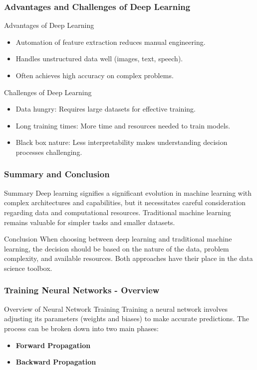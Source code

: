 \documentclass[aspectratio=169]{beamer}
\begin{document}
\begin{frame}[fragile]
    \frametitle{Advantages and Challenges of Deep Learning}
    \begin{block}{Advantages of Deep Learning}
        \begin{itemize}
            \item Automation of feature extraction reduces manual engineering.
            \item Handles unstructured data well (images, text, speech).
            \item Often achieves high accuracy on complex problems.
        \end{itemize}
    \end{block}

    \begin{block}{Challenges of Deep Learning}
        \begin{itemize}
            \item Data hungry: Requires large datasets for effective training.
            \item Long training times: More time and resources needed to train models.
            \item Black box nature: Less interpretability makes understanding decision processes challenging.
        \end{itemize}
    \end{block}
\end{frame}

\begin{frame}[fragile]
    \frametitle{Summary and Conclusion}
    \begin{block}{Summary}
        Deep learning signifies a significant evolution in machine learning with complex architectures and capabilities, but it necessitates careful consideration regarding data and computational resources. Traditional machine learning remains valuable for simpler tasks and smaller datasets.
    \end{block}
    
    \begin{block}{Conclusion}
        When choosing between deep learning and traditional machine learning, the decision should be based on the nature of the data, problem complexity, and available resources. Both approaches have their place in the data science toolbox.
    \end{block}
\end{frame}

\begin{frame}[fragile]
    \frametitle{Training Neural Networks - Overview}
    \begin{block}{Overview of Neural Network Training}
        Training a neural network involves adjusting its parameters (weights and biases) to make accurate predictions. The process can be broken down into two main phases:
    \end{block}
    \begin{itemize}
        \item \textbf{Forward Propagation}
        \item \textbf{Backward Propagation}
    \end{itemize}
\end{frame}
\end{document}
